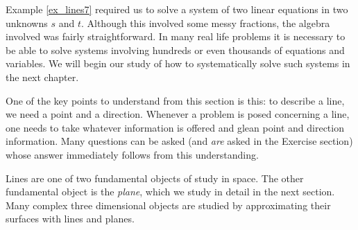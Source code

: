 

Example \ref{ex_lines7} required us to solve a system of two linear equations in two unknowns $s$ and $t$. Although this involved some messy fractions, the algebra involved was fairly straightforward. In many real life problems it is necessary to be able to solve systems involving hundreds or even thousands of equations and variables. We will begin our study of how to systematically solve such systems in the next chapter.


One of the key points to understand from this section is this: to describe a line, we need a point and a direction. Whenever a problem is posed concerning a line, one  needs to take whatever information is offered and glean point and direction information. Many questions can be asked (and \emph{are} asked in the Exercise section) whose answer immediately follows from this understanding. 

Lines are one of two fundamental objects of study in space. The other fundamental object is the \emph{plane}, which we study in detail in the next section. Many complex three dimensional objects are studied by approximating their surfaces with lines and planes.






